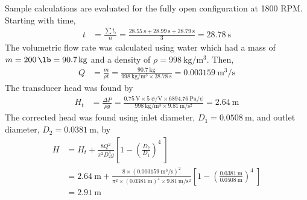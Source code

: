 Sample calculations are evaluated for the fully open configuration at 1800 RPM. Starting with time,
\begin{align*}
        t &= \frac{\sum t_i}{n} = \frac{\qty{28.55}{\second} + \qty{28.99}{\second} + \qty{28.79}{\second}}{3} = \qty{28.78}{\second}
\end{align*}
The volumetric flow rate was calculated using water which had a mass of $m = \qty{200}{\lb} = \qty{90.7}{\kilo\gram}$ and a density of $\rho = \qty{998}{\kilo\gram\per\meter\cubed}$. Then,
\begin{align*}
    Q &= \frac{m}{\rho t} = \frac{\qty{90.7}{\kilo\gram}}{\qty{998}{\kilo\gram\per\meter\cubed} \times \qty{28.78}{\second}} = \qty{0.003159}{\meter\cubed\per\second}
\end{align*}
The transducer head was found by
\begin{align*}
    H_t &= \frac{\Delta P}{\rho g} = \frac{\qty{0.75}{\volt} \times \qty{5}{\psi\per\volt} \times \qty{6894.76}{\pascal\per\psi}}{\qty{998}{\kilo\gram\per\meter\cubed} \times \qty{9.81}{\meter\per\second\squared}} = \qty{2.64}{\meter}
\end{align*}
The corrected head was found using inlet diameter, $D_1 = \qty{0.0508}{\meter}$, and outlet diameter, $D_2 = \qty{0.0381}{\meter}$, by
\begin{align*}
    H &= H_t + \frac{8Q^2}{\pi^2 D_2^4 g} \left[1 - \left(\frac{D_2}{D_1}\right)^4\ \right] \\
    &= \qty{2.64}{\meter} + \frac{8 \times (\qty{0.003159}{\meter\cubed\per\second})^2}{\pi^2 \times (\qty{0.0381}{\meter})^4 \times \qty{9.81}{\meter\per\second\squared}} \left[1 - \left(\frac{\qty{0.0381}{\meter}}{\qty{0.0508}{\meter}}\right)^4\ \right] \\
    &= \qty{2.91}{\meter}
\end{align*}

